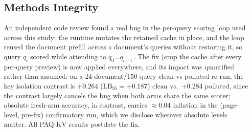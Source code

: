 \documentclass[letterpaper]{article} %
\newcommand{\paqc}{\textsc{PAQ-KV}}
\newcommand{\lb}{\mathrm{LB}_{95}}
\begin{document}
\subsection{Methods Integrity}\label{sec:integrity}
An independent code review found a real bug in the per-query scoring loop used across this study: the runtime mutates the retained cache in place, and the loop reused the document prefill across a document's queries without restoring it, so query $q_i$ scored while attending to $q_0\ldots q_{i-1}$. The fix (crop the cache after every per-query preview) is now applied everywhere, and its impact was quantified rather than assumed: on a 24-document/150-query clean-vs-polluted re-run, the key isolation contrast is $+0.264$ ($\lb=+0.187$) clean vs.\ $+0.284$ polluted, since the contrast largely cancels the bug when both arms share the same scorer; absolute fresh-arm accuracy, in contrast, carries ${\approx}0.04$ inflation in the (page-level, pre-fix) confirmatory run, which we disclose wherever absolute levels matter. All \paqc{} results postdate the fix.
\end{document}
